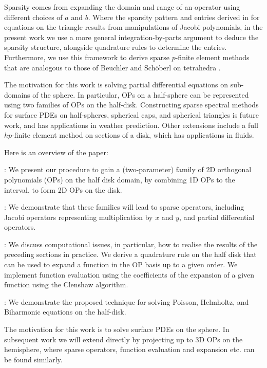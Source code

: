 \documentclass[11pt, oneside]{article}   	%
\newcommand{\sotodo}{\todo[color=green]}
\begin{document}
 Sparsity comes from expanding the domain and range of an operator  using different choices of $a$ and $b$. Where the sparsity pattern and entries derived in \cite{olver2018recurrence,olver2019triangle} for equations on the triangle  results from manipulations of Jacobi polynomials, in the present work we use a more general integration-by-parts argument to deduce the sparsity structure, alongside quadrature rules to determine the entries.  Furthermore, we use this framework to derive sparse $p$-finite element methods that are analogous to those of Beuchler and Sch\"oberl on tetrahedra \cite{beuchler2006new}. 

The motivation for this work is solving partial differential equations on sub-domains of the sphere. In particular, OPs on a half-sphere can be represented using two families of OPs on the half-disk\sotodo{Explain this}. Constructing sparse spectral methods for surface PDEs on half-spheres, spherical caps, and spherical triangles is future work, and has applications in weather prediction. Other extensions include a full $hp$-finite element method on sections of a disk, which has applications in fluids. 

Here is an overview of the paper:  

\noindent {}: We present our procedure  to gain a (two-parameter) family of 2D orthogonal polynomials (OPs) on the half disk domain, by combining 1D OPs to the interval, to form 2D OPs on the disk. 

\noindent{}: We demonstrate that these families will lead to sparse operators, including Jacobi operators representing multiplication by $x$ and $y$, and partial differential operators.

\noindent{}: We discuss computational issues, in particular, how to realise the results of the preceding sections in practice.  We  derive a quadrature rule on the half disk that can be used to expand a function in the OP basis up to a given order.  We implement function evaluation using the coefficients of the expansion of a given function using the Clenshaw algorithm.

\noindent{}: We demonstrate the proposed technique for solving Poisson, Helmholtz, and Biharmonic equations on the half-disk.  


The motivation for this work is to solve surface PDEs on the sphere.
In subsequent work we will extend  directly by projecting up to 3D OPs on the hemisphere, where sparse operators, function evaluation and expansion etc. can be found similarly. 
\end{document}
